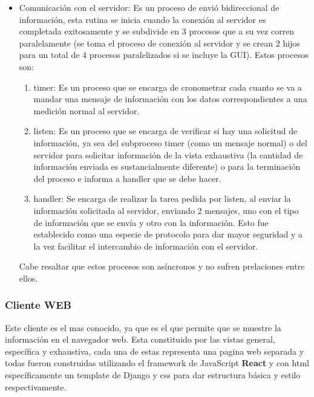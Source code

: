 \begin{itemize}
    \item Comunicación con el servidor: Es un proceso de envió bidireccional
        de información, esta rutina se inicia cuando la conexión al servidor
        es completada exitosamente y se subdivide en 3 procesos que a su
        vez corren paralelamente (se toma el proceso de conexión al servidor
        y se crean 2 hijos para un total de 4 procesos paralelizados si se
        incluye la GUI). Estos procesos son:

        \begin{enumerate}
            \item timer: Es un proceso que se encarga de cronometrar cada cuanto
                se va a mandar una mensaje de información con los datos
                correspondientes a una medición normal al servidor.

            \item listen: Es un proceso que se encarga de verificar si hay una
                solicitud de información, ya sea del subproceso timer (como un
                mensaje normal) o del servidor para solicitar información de la
                vista exhaustiva (la cantidad de información enviada es sustancialmente
                diferente) o para la terminación del proceso e informa a handler
                que se debe hacer.

            \item handler: Se encarga de realizar la tarea pedida por listen,
                al enviar la información solicitada al servidor, enviando 2 mensajes,
                uno con el tipo de información que se envía y otro con la información.
                Esto fue establecido como una especie de protocolo para dar mayor
                seguridad y a la vez facilitar el intercambio de información con
                el servidor.
        \end{enumerate}

        Cabe resaltar que estos procesos son asíncronos y no sufren prelaciones
        entre ellos.
\end{itemize}

\subsubsection{Cliente WEB}

Este cliente es el mas conocido, ya que es el que permite que se muestre la
información en el navegador web. Esta constituido por las vistas general,
específica y exhaustiva, cada una de estas representa una pagina web separada y
todas fueron construidas utilizando el framework de JavaScript \textbf{React}
y con html específicamente un template de Django y css para dar estructura
básica y estilo respectivamente.

